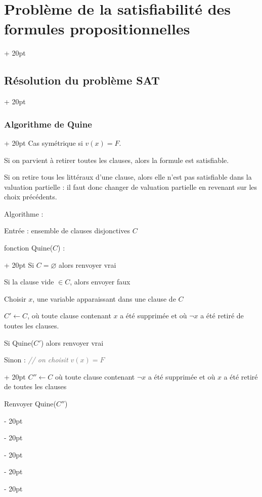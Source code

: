 \documentclass[a4paper, 12pt, twoside]{article}
\newcommand{\ind}[1][20pt]{\advance\leftskip + #1}
\newcommand{\deind}[1][20pt]{\advance\leftskip - #1}
\newenvironment{indt}[2][20pt]{#2 \par \ind[#1]}{\par \deind} %
\begin{document}
\begin{indt}{\section{Problème de la satisfiabilité des formules propositionnelles}}
\begin{indt}{\subsection{Résolution du problème SAT}}
\begin{indt}{\subsubsection{Algorithme de Quine}}
                Cas symétrique si $v(x) = F$.
                
                Si on parvient à retirer toutes les clauses, alors la formule est satisfiable.
                
                Si on retire tous les littéraux d'une clause, alors elle n'est pas satisfiable dans la valuation partielle : il faut donc changer de valuation partielle en revenant sur les choix précédents.
                
                \vspace{12pt}
                
                Algorithme :
                
                Entrée : ensemble de clauses disjonctives $C$
                
                \begin{pseudocode}
                    \begin{indt}{fonction Quine($C$) :}
                        Si $C = \varnothing$ alors renvoyer vrai
                        
                        Si la clause vide $\in C$, alors envoyer faux
                        
                        \vspace{6pt}
                        
                        Choisir $x$, une variable apparaissant dans une clause de $C$
                        
                        $C' \leftarrow C$, où toute clause contenant $x$ a été supprimée et où $\neg x$  a été retiré de toutes les clauses.
                        
                        \vspace{6pt}
                        
                        Si Quine($C'$) alors renvoyer vrai
                        
                        \begin{indt}{Sinon : \textcolor{656565}{\it // on choisit $v(x) = F$}}
                            $C'' \leftarrow C$ où toute clause contenant $\neg x$ a été supprimée et où $x$ a été retiré de toutes les clauses
                            
                            Renvoyer Quine($C''$)
                        \end{indt}
                    \end{indt}
                \end{pseudocode}
                

\end{indt}
\end{indt}
\end{indt}
\end{document}
